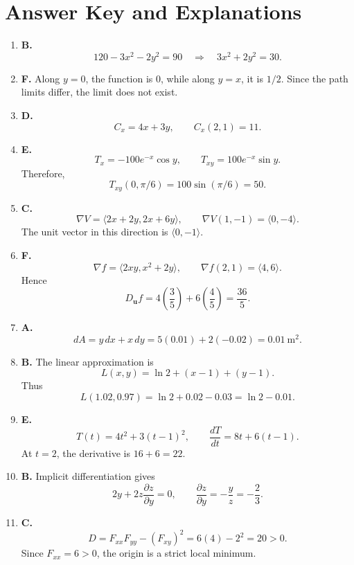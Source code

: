 \documentclass[a4paper,12pt]{article}
\theoremstyle{mystyle}
\numberwithin{equation}{section}
\numberwithin{theorem}{section}
\numberwithin{proposition}{section}
\numberwithin{example}{section}
\numberwithin{remark}{section}
\numberwithin{lemma}{section}
\numberwithin{corollary}{section}
\numberwithin{definition}{section}
\begin{document}
\section{Answer Key and Explanations}

\begin{enumerate}[label=\textbf{Question \arabic*.},leftmargin=*]

\item \textbf{B.}
\[
120-3x^2-2y^2=90
\quad\Longrightarrow\quad
3x^2+2y^2=30.
\]

\item \textbf{F.} Along \(y=0\), the function is \(0\), while along
\(y=x\), it is \(1/2\). Since the path limits differ, the limit
does not exist.

\item \textbf{D.}
\[
C_x=4x+3y,\qquad C_x(2,1)=11.
\]

\item \textbf{E.}
\[
T_x=-100e^{-x}\cos y,\qquad
T_{xy}=100e^{-x}\sin y.
\]
Therefore,
\[
T_{xy}(0,\pi/6)=100\sin(\pi/6)=50.
\]

\item \textbf{C.}
\[
\nabla V=\langle2x+2y,2x+6y\rangle,
\qquad \nabla V(1,-1)=\langle0,-4\rangle.
\]
The unit vector in this direction is \(\langle0,-1\rangle\).

\item \textbf{F.}
\[
\nabla f=\langle2xy,x^2+2y\rangle,
\qquad \nabla f(2,1)=\langle4,6\rangle.
\]
Hence
\[
D_{\mathbf u}f
=4\left(\frac35\right)+6\left(\frac45\right)
=\frac{36}{5}.
\]

\item \textbf{A.}
\[
dA=y\,dx+x\,dy
=5(0.01)+2(-0.02)=0.01\ \mathrm{m}^2.
\]

\item \textbf{B.}
The linear approximation is
\[
L(x,y)=\ln2+(x-1)+(y-1).
\]
Thus
\[
L(1.02,0.97)=\ln2+0.02-0.03=\ln2-0.01.
\]

\item \textbf{E.}
\[
T(t)=4t^2+3(t-1)^2,\qquad
\frac{dT}{dt}=8t+6(t-1).
\]
At \(t=2\), the derivative is \(16+6=22\).

\item \textbf{B.}
Implicit differentiation gives
\[
2y+2z\frac{\partial z}{\partial y}=0,
\qquad
\frac{\partial z}{\partial y}=-\frac{y}{z}=-\frac23.
\]

\item \textbf{C.}
\[
D=F_{xx}F_{yy}-(F_{xy})^2
=6(4)-2^2=20>0.
\]
Since \(F_{xx}=6>0\), the origin is a strict local minimum.


\end{enumerate}
\end{document}
